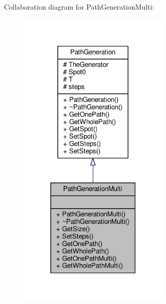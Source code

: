 Collaboration diagram for Path\+Generation\+Multi\+:
\nopagebreak
\begin{figure}[H]
\begin{center}
\leavevmode
\includegraphics[width=206pt]{classPathGenerationMulti__coll__graph}
\end{center}
\end{figure}
